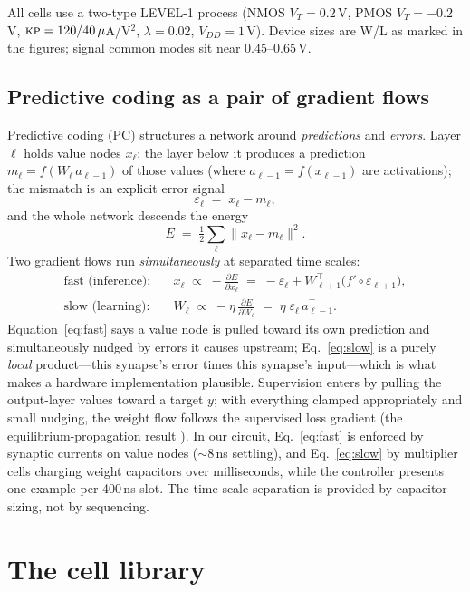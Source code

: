 \documentclass[11pt]{article}
\newcommand{\eps}{\varepsilon}
\begin{document}
All cells use a two-type LEVEL-1 process (NMOS $V_{T}=0.2$\,V, PMOS $V_{T}=-0.2$\,V, $\textsc{kp}=120/40\,\mu$A/V$^2$, $\lambda=0.02$, $V_{DD}=1$\,V). Device sizes are W/L as marked in the figures; signal common modes sit near $0.45$--$0.65$\,V.

\subsection{Predictive coding as a pair of gradient flows}
\label{sec:pc}

Predictive coding (PC) \cite{rao1999,whittington2017} structures a network around \emph{predictions} and \emph{errors}. Layer $\ell$ holds value nodes $x_\ell$; the layer below it produces a prediction $m_\ell = f(W_\ell\, a_{\ell-1})$ of those values (where $a_{\ell-1}=f(x_{\ell-1})$ are activations); the mismatch is an explicit error signal
\[
\eps_\ell \;=\; x_\ell - m_\ell ,
\]
and the whole network descends the energy
\[
E \;=\; \tfrac12 \sum_\ell \lVert x_\ell - m_\ell \rVert^2 .
\]
Two gradient flows run \emph{simultaneously} at separated time scales:
\begin{align}
\text{fast (inference):}\quad & \dot x_\ell \;\propto\; -\frac{\partial E}{\partial x_\ell} \;=\; -\eps_\ell + W_{\ell+1}^{\!\top}\!\big(f'\circ\eps_{\ell+1}\big), \label{eq:fast}\\[2pt]
\text{slow (learning):}\quad & \dot W_\ell \;\propto\; -\eta\,\frac{\partial E}{\partial W_\ell} \;=\; \eta\;\eps_\ell\, a_{\ell-1}^{\!\top}. \label{eq:slow}
\end{align}
Equation~\eqref{eq:fast} says a value node is pulled toward its own prediction and simultaneously nudged by errors it causes upstream; Eq.~\eqref{eq:slow} is a purely \emph{local} product---this synapse's error times this synapse's input---which is what makes a hardware implementation plausible. Supervision enters by pulling the output-layer values toward a target $y$; with everything clamped appropriately and small nudging, the weight flow follows the supervised loss gradient (the equilibrium-propagation result \cite{scellier2017}). In our circuit, Eq.~\eqref{eq:fast} is enforced by synaptic currents on value nodes ($\sim$8\,ns settling), and Eq.~\eqref{eq:slow} by multiplier cells charging weight capacitors over milliseconds, while the controller presents one example per 400\,ns slot. The time-scale separation is provided by capacitor sizing, not by sequencing.

\section{The cell library}
\label{sec:cells}
\end{document}
